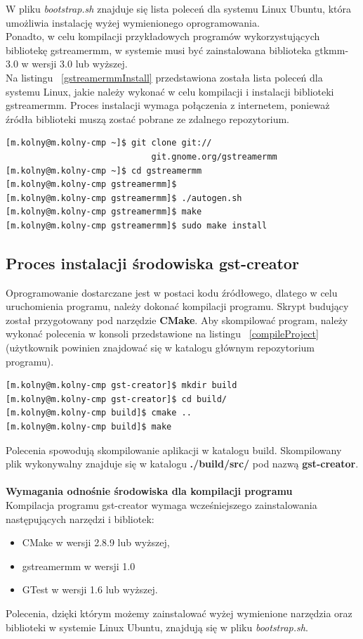 \documentclass[12pt]{article}
\begin{document}
W pliku \textit{bootstrap.sh} znajduje się lista poleceń dla systemu Linux Ubuntu, która umożliwia instalację wyżej wymienionego oprogramowania.\\
Ponadto, w celu kompilacji przykładowych programów wykorzystujących bibliotekę gstreamermm, w systemie musi być zainstalowana biblioteka gtkmm-3.0 w wersji 3.0 lub wyższej.\\
Na listingu ~\ref{gstreamermmInstall} przedstawiona została lista poleceń dla systemu Linux, jakie należy wykonać w celu kompilacji i instalacji biblioteki gstreamermm. Proces instalacji wymaga połączenia z internetem, ponieważ źródła biblioteki muszą zostać pobrane ze zdalnego repozytorium.
\begin{lstlisting}[caption=Polecenia kompilujące program gst-creator, label=gstreamermmInstall]
[m.kolny@m.kolny-cmp ~]$ git clone git://
                             git.gnome.org/gstreamermm
[m.kolny@m.kolny-cmp ~]$ cd gstreamermm
[m.kolny@m.kolny-cmp gstreamermm]$ 
[m.kolny@m.kolny-cmp gstreamermm]$ ./autogen.sh
[m.kolny@m.kolny-cmp gstreamermm]$ make
[m.kolny@m.kolny-cmp gstreamermm]$ sudo make install
\end{lstlisting}


\subsection{Proces instalacji środowiska gst-creator}
Oprogramowanie dostarczane jest w postaci kodu źródłowego, dlatego w celu uruchomienia programu, należy dokonać kompilacji programu. Skrypt budujący został przygotowany pod narzędzie \textbf{CMake}. Aby skompilować program, należy wykonać polecenia w konsoli przedstawione na listingu ~\ref{compileProject} (użytkownik powinien znajdować się w katalogu głównym repozytorium programu).
\begin{lstlisting}[caption=Polecenia kompilujące program gst-creator, label=compileProject]
[m.kolny@m.kolny-cmp gst-creator]$ mkdir build
[m.kolny@m.kolny-cmp gst-creator]$ cd build/
[m.kolny@m.kolny-cmp build]$ cmake ..
[m.kolny@m.kolny-cmp build]$ make
\end{lstlisting}
Polecenia spowodują skompilowanie aplikacji w katalogu build. Skompilowany plik wykonywalny znajduje się w katalogu \textbf{./build/src/} pod nazwą \textbf{gst-creator}. 
\paragraph{}
\textbf{Wymagania odnośnie środowiska dla kompilacji programu} \\
Kompilacja programu gst-creator wymaga wcześniejszego zainstalowania następujących narzędzi i bibliotek:
\begin{itemize}
  \setlength{\itemsep}{0em}
\item CMake w wersji 2.8.9 lub wyższej,
\item gstreamermm w wersji 1.0
\item GTest w wersji 1.6 lub wyższej.
\end{itemize}
Polecenia, dzięki którym możemy zainstalować wyżej wymienione narzędzia oraz biblioteki w systemie Linux Ubuntu, znajdują się w pliku \textit{bootstrap.sh}.
\end{document}
